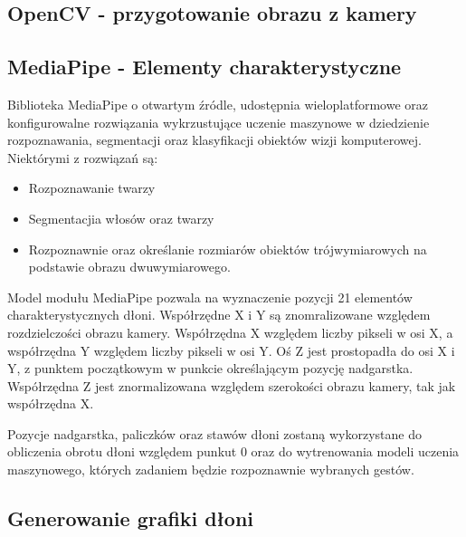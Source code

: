 \subsection{OpenCV - przygotowanie obrazu z kamery}



\subsection{MediaPipe - Elementy charakterystyczne}

\quad Biblioteka MediaPipe o otwartym źródle, udostępnia wieloplatformowe oraz konfigurowalne rozwiązania wykrzustujące uczenie maszynowe w dziedzienie rozpoznawania, segmentacji oraz klasyfikacji obiektów wizji komputerowej. Niektórymi z rozwiązań są:

\begin{itemize}
    \item Rozpoznawanie twarzy
    \item Segmentacjia włosów oraz twarzy
    \item Rozpoznawnie oraz określanie rozmiarów obiektów trójwymiarowych 
          na podstawie obrazu dwuwymiarowego. 
\end{itemize}

\quad Model modułu MediaPipe pozwala na wyznaczenie pozycji 21 elementów charakterystycznych dłoni. Współrzędne X i Y są znomralizowane względem rozdzielczości obrazu kamery. Współrzędna X względem liczby pikseli w osi X, a współrzędna Y względem liczby pikseli w osi Y. Oś Z jest prostopadła do osi X i Y, z punktem początkowym w punkcie określającym pozycję nadgarstka. Współrzędna Z jest znormalizowana względem szerokości obrazu kamery, tak jak współrzędna X. 


\quad Pozycje nadgarstka, paliczków oraz stawów dłoni zostaną wykorzystane do obliczenia obrotu dłoni względem punkut 0 oraz do wytrenowania modeli uczenia maszynowego, których zadaniem będzie rozpoznawnie wybranych gestów. 

\subsection{Generowanie grafiki dłoni}

